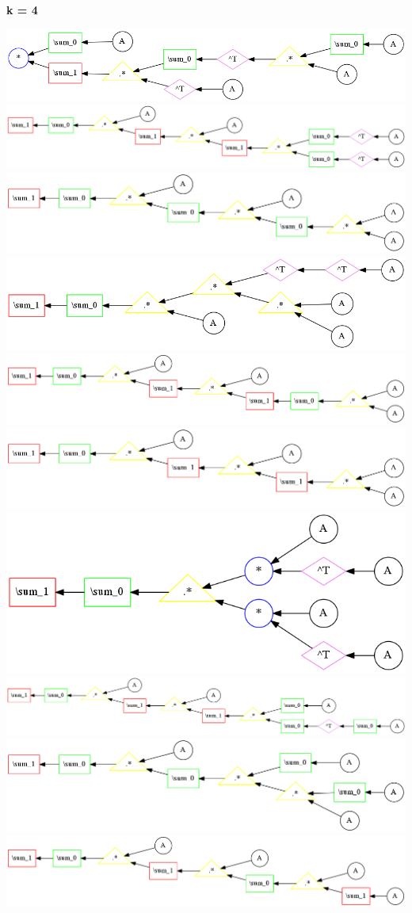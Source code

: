 {\bf k = 4}


\begin{center}
\includegraphics[width=0.45\linewidth]{trees/RBM_4_horizontal_0.png}
\includegraphics[width=0.45\linewidth]{trees/RBM_4_horizontal_1.png}
\includegraphics[width=0.45\linewidth]{trees/RBM_4_horizontal_2.png}
\includegraphics[width=0.45\linewidth]{trees/RBM_4_horizontal_3.png}
\includegraphics[width=0.45\linewidth]{trees/RBM_4_horizontal_4.png}
\includegraphics[width=0.45\linewidth]{trees/RBM_4_horizontal_5.png}
\includegraphics[width=0.45\linewidth]{trees/RBM_4_horizontal_6.png}
\includegraphics[width=0.45\linewidth]{trees/RBM_4_horizontal_7.png}
\includegraphics[width=0.45\linewidth]{trees/RBM_4_horizontal_8.png}
\includegraphics[width=0.45\linewidth]{trees/RBM_4_horizontal_9.png}

\end{center}
